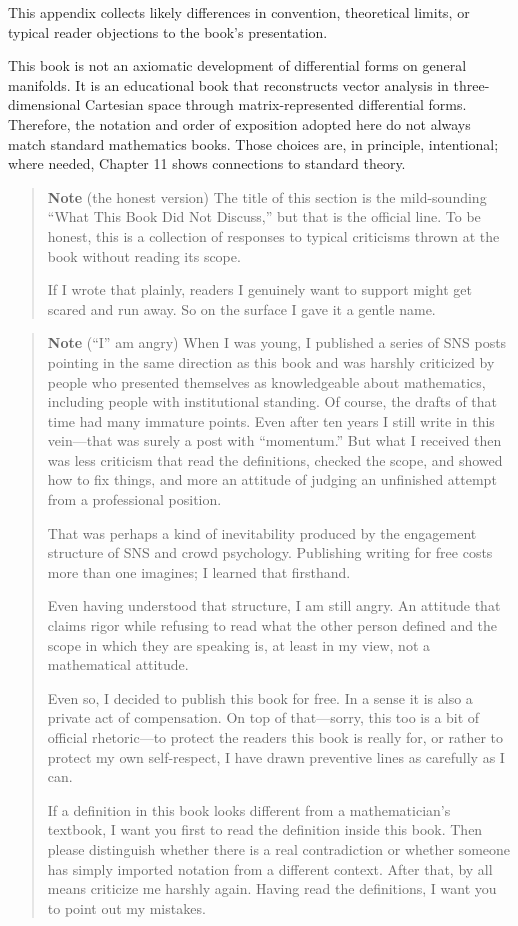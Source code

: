 \documentclass[a4paper,12pt,openany]{book}
\begin{document}
This appendix collects likely differences in convention, theoretical
limits, or typical reader objections to the book's presentation.

This book is not an axiomatic development of differential forms on
general manifolds. It is an educational book that reconstructs vector
analysis in three-dimensional Cartesian space through matrix-represented
differential forms. Therefore, the notation and order of exposition
adopted here do not always match standard mathematics books. Those
choices are, in principle, intentional; where needed, Chapter 11 shows
connections to standard theory.

\begin{quote}
\textbf{Note} (the honest version) The title of this section is the
mild-sounding ``What This Book Did Not Discuss,'' but that is the
official line. To be honest, this is a collection of responses to
typical criticisms thrown at the book without reading its scope.

If I wrote that plainly, readers I genuinely want to support might get
scared and run away. So on the surface I gave it a gentle name.
\end{quote}

\begin{quote}
\textbf{Note} (``I'' am angry) When I was young, I published a series of
SNS posts pointing in the same direction as this book and was harshly
criticized by people who presented themselves as knowledgeable about
mathematics, including people with institutional standing. Of course,
the drafts of that time had many immature points. Even after ten years I
still write in this vein—that was surely a post with ``momentum.'' But
what I received then was less criticism that read the definitions,
checked the scope, and showed how to fix things, and more an attitude of
judging an unfinished attempt from a professional position.

That was perhaps a kind of inevitability produced by the engagement
structure of SNS and crowd psychology. Publishing writing for free costs
more than one imagines; I learned that firsthand.

Even having understood that structure, I am still angry. An attitude
that claims rigor while refusing to read what the other person defined
and the scope in which they are speaking is, at least in my view, not a
mathematical attitude.

Even so, I decided to publish this book for free. In a sense it is also
a private act of compensation. On top of that—sorry, this too is a bit
of official rhetoric—to protect the readers this book is really for,
or rather to protect my own self-respect, I have drawn preventive lines
as carefully as I can.

If a definition in this book looks different from a mathematician's
textbook, I want you first to read the definition inside this book. Then
please distinguish whether there is a real contradiction or whether
someone has simply imported notation from a different context. After
that, by all means criticize me harshly again. Having read the
definitions, I want you to point out my mistakes.
\end{quote}
\end{document}
